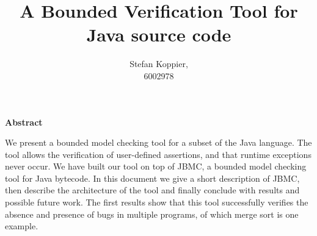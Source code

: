 \documentclass[a4paper]{book}
\makeatletter
\newcommand\abstractname{Abstract}  %
\newenvironment{abstract}{%
      \titlepage
      \null\vfil
      \@beginparpenalty\@lowpenalty
      \begin{center}%
        \bfseries \abstractname
        \@endparpenalty\@M
      \end{center}}%
     {\par\vfil\null\endtitlepage}
\newenvironment{abstract}{%
      \if@twocolumn
        \section*{\abstractname}%
      \else
        \small
        \begin{center}%
          {\bfseries \abstractname\vspace{-.5em}\vspace{\z@}}%
        \end{center}%
        \quotation
      \fi}
      {\if@twocolumn\else\endquotation\fi}
\makeatother
\begin{document}
\title{A Bounded Verification Tool for Java source code}
\author{Stefan Koppier, \\ 6002978}
\maketitle

\begin{abstract}
We present a bounded model checking tool for a subset of the Java language. The 
tool allows the verification of user-defined assertions, and that runtime exceptions
never occur. We have built our tool on top of JBMC, a bounded model checking tool 
for Java bytecode. In this document we give a short description of JBMC, then
describe the architecture of the tool and finally conclude with results and possible
future work. The first results show that this tool successfully verifies the absence
and presence of bugs in multiple programs, of which merge sort is one example.
\end{abstract}



\tableofcontents












\begin{appendices}
    
\end{appendices}
\end{document}
